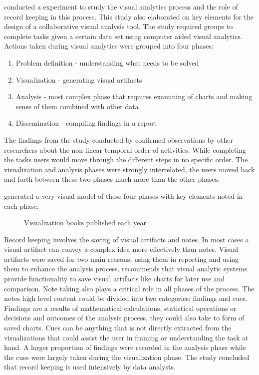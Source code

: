 \cite{mahyar2010closer} conducted a experiment to study the visual analytics process and the role of record keeping in this process. This study also elaborated on key elements for the design of a collaborative visual analysis tool. The study required groups to complete tasks given a certain data set using computer aided visual analytics.
Actions taken during visual analytics were grouped into four phases:
\begin{enumerate}
	\item Problem definition - understanding what needs to be solved
	\item Visualization - generating visual artifacts
	\item Analysis - most complex phase that requires examining of charts and making sense of them combined with other data
	\item Dissemination - compiling findings in a report
\end{enumerate}
The findings from the study conducted by \cite{mahyar2010closer} confirmed observations by other researchers about the non-linear temporal order of activities. While completing the tasks users would move through the different steps in no specific order. The visualization and analysis phases were strongly interrelated, the users moved back and forth between these two phases much more than the other phases.

\cite{mahyar2010closer} generated a very visual model of these four phases with key elements noted in each phase:
\begin{figure}[!ht]
	\centering{}
	\caption{Visualization books published each year}\label{fig:2}
\end{figure}

Record keeping involves the saving of visual artifacts and notes. In most cases a visual artifact can convey a complex idea more effectively than notes. Visual artifacts were saved for two main reasons; using them in reporting and using them to enhance the analysis process.\cite{mahyar2010closer} recommends that visual analytic systems provide functionality to save visual artifacts like charts for later use and comparison. Note taking also plays a critical role in all phases of the process. The notes high level content could be divided into two categories; findings and cues. Findings are a results of mathematical calculations, statistical operations or decisions and outcomes of the analysis process, they could also take to form of saved charts. Cues can be anything that is not directly extracted from the visualizations that could assist the user in framing or understanding the task at hand. A larger proportion of findings were recorded in the analysis phase while the cues were largely taken during the visualization phase. The study concluded that record keeping is used intensively by data analysts.

